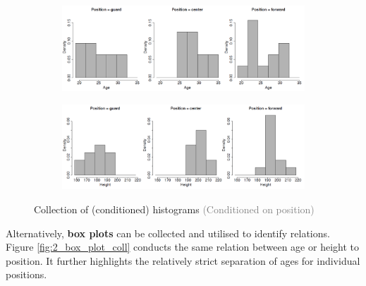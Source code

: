 \begin{figure}[H]
  \centering
  \begin{subfigure}{0.8\textwidth}
    \centering
    \includegraphics[width=\textwidth]{assets/visualization_and_extraction/feature_relation/histo_no.png}
  \end{subfigure}
  
  \vspace*{0.2cm}

  \begin{subfigure}{0.8\textwidth}
    \centering
    \includegraphics[width=\textwidth]{assets/visualization_and_extraction/feature_relation/histo_strong.png}
  \end{subfigure}
  \caption{Collection of (conditioned) histograms \textcolor{gray}{\footnotesize (Conditioned on position)}}
  \label{fig:2_histoplot}
\end{figure}

Alternatively, \textbf{box plots} can be collected and utilised to identify relations. Figure \ref{fig:2_box_plot_coll} conducts the same relation between age or height to position. It further highlights the relatively strict separation of ages for individual positions.

